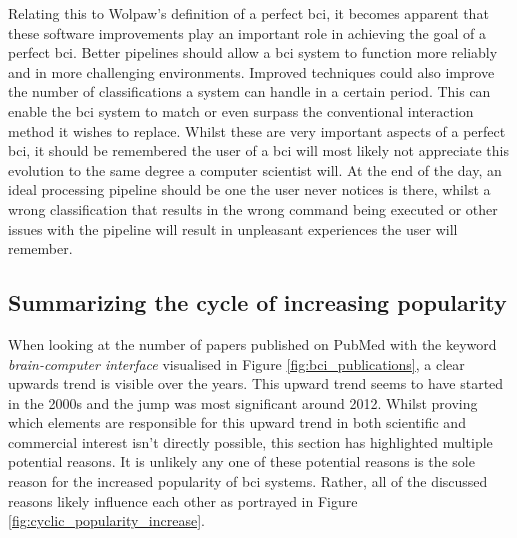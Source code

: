 Relating this to Wolpaw's definition of a perfect \gls{bci}, it becomes apparent that these software improvements play an important role in achieving the goal of a perfect \gls{bci}.
Better pipelines should allow a \gls{bci} system to function more reliably and in more challenging environments. 
Improved techniques could also improve the number of classifications a system can handle in a certain period.
This can enable the \gls{bci} system to match or even surpass the conventional interaction method it wishes to replace.
Whilst these are very important aspects of a perfect \gls{bci}, it should be remembered the user of a \gls{bci} will most likely not appreciate this evolution to the same degree a computer scientist will.
At the end of the day, an ideal processing pipeline should be one the user never notices is there, whilst a wrong classification that results in the wrong command being executed or other issues with the pipeline will result in unpleasant experiences the user will remember. 


\subsection{Summarizing the cycle of increasing popularity}
\label{subsec:bci_gaining_popularity_summary}

When looking at the number of papers published on PubMed with the keyword \textit{brain-computer interface} visualised in Figure \ref{fig:bci_publications}, a clear upwards trend is visible over the years.
This upward trend seems to have started in the 2000s and the jump was most significant around 2012.
Whilst proving which elements are responsible for this upward trend in both scientific and commercial interest isn't directly possible, this section has highlighted multiple potential reasons.
It is unlikely any one of these potential reasons is the sole reason for the increased popularity of \gls{bci} systems.
Rather, all of the discussed reasons likely influence each other as portrayed in Figure \ref{fig:cyclic_popularity_increase}.

